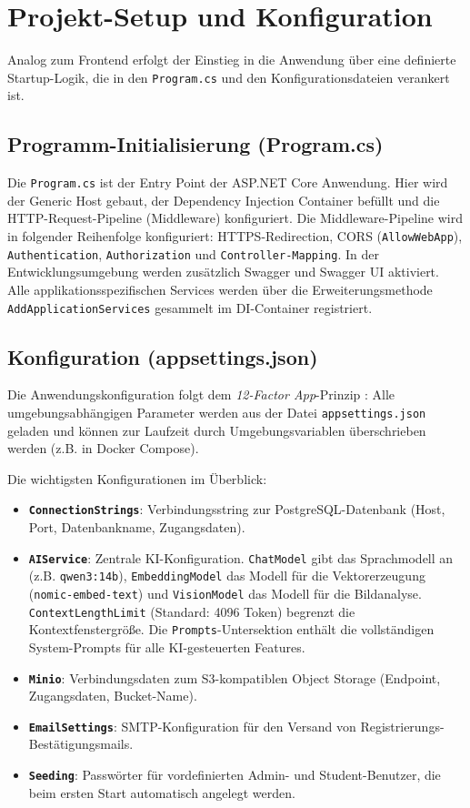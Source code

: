 \section{Projekt-Setup und Konfiguration}
Analog zum Frontend erfolgt der Einstieg in die Anwendung über eine definierte Startup-Logik, die in den \texttt{Program.cs} und den Konfigurationsdateien verankert ist.

\subsection{Programm-Initialisierung (Program.cs)}
Die \texttt{Program.cs} ist der Entry Point der ASP.NET Core Anwendung. Hier wird der \glqq{}Generic Host\grqq{} gebaut, der Dependency Injection Container befüllt und die HTTP-Request-Pipeline (Middleware) konfiguriert.
Die Middleware-Pipeline wird in folgender Reihenfolge konfiguriert: HTTPS-Redirection, CORS (\texttt{AllowWebApp}), \texttt{Authentication}, \texttt{Authorization} und \texttt{Controller-Mapping}. In der Entwicklungsumgebung werden zusätzlich Swagger und Swagger UI aktiviert. Alle applikationsspezifischen Services werden über die Erweiterungsmethode \texttt{AddApplicationServices} gesammelt im DI-Container registriert.

\subsection{Konfiguration (appsettings.json)}
Die Anwendungskonfiguration folgt dem \textit{12-Factor App}-Prinzip \cite{twelvefactor}: Alle umgebungsabhängigen Parameter werden aus der Datei \texttt{appsettings.json} geladen und können zur Laufzeit durch Umgebungsvariablen überschrieben werden (z.B. in Docker Compose).

Die wichtigsten Konfigurationen im Überblick:
\begin{itemize}
    \item \textbf{\texttt{ConnectionStrings}}: Verbindungsstring zur PostgreSQL-Datenbank (Host, Port, Datenbankname, Zugangsdaten).
    \item \textbf{\texttt{AIService}}: Zentrale KI-Konfiguration. \texttt{ChatModel} gibt das Sprachmodell an (z.B. \texttt{qwen3:14b}), \texttt{EmbeddingModel} das Modell für die Vektorerzeugung (\texttt{nomic-embed-text}) und \texttt{VisionModel} das Modell für die Bildanalyse. \texttt{ContextLengthLimit} (Standard: 4096 Token) begrenzt die Kontextfenstergröße. Die \texttt{Prompts}-Untersektion enthält die vollständigen System-Prompts für alle KI-gesteuerten Features.
    \item \textbf{\texttt{Minio}}: Verbindungsdaten zum S3-kompatiblen Object Storage (Endpoint, Zugangsdaten, Bucket-Name).
    \item \textbf{\texttt{EmailSettings}}: SMTP-Konfiguration für den Versand von Registrierungs-Bestätigungsmails.
    \item \textbf{\texttt{Seeding}}: Passwörter für vordefinierten Admin- und Student-Benutzer, die beim ersten Start automatisch angelegt werden.
\end{itemize}
